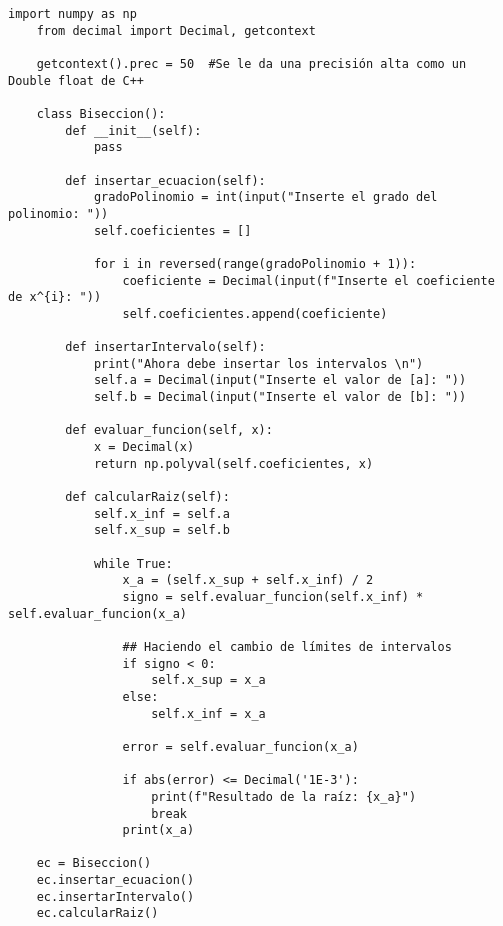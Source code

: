 \begin{lstlisting}[style=jupyter]
    import numpy as np
    from decimal import Decimal, getcontext
    
    getcontext().prec = 50  #Se le da una precisión alta como un Double float de C++
    
    class Biseccion():
        def __init__(self):
            pass
    
        def insertar_ecuacion(self):
            gradoPolinomio = int(input("Inserte el grado del polinomio: "))
            self.coeficientes = []
    
            for i in reversed(range(gradoPolinomio + 1)):
                coeficiente = Decimal(input(f"Inserte el coeficiente de x^{i}: "))
                self.coeficientes.append(coeficiente)
        
        def insertarIntervalo(self):
            print("Ahora debe insertar los intervalos \n")
            self.a = Decimal(input("Inserte el valor de [a]: "))
            self.b = Decimal(input("Inserte el valor de [b]: "))
    
        def evaluar_funcion(self, x):
            x = Decimal(x)
            return np.polyval(self.coeficientes, x)
        
        def calcularRaiz(self):
            self.x_inf = self.a
            self.x_sup = self.b
    
            while True:
                x_a = (self.x_sup + self.x_inf) / 2
                signo = self.evaluar_funcion(self.x_inf) * self.evaluar_funcion(x_a)
    
                ## Haciendo el cambio de límites de intervalos
                if signo < 0:
                    self.x_sup = x_a
                else:
                    self.x_inf = x_a
    
                error = self.evaluar_funcion(x_a)
    
                if abs(error) <= Decimal('1E-3'):
                    print(f"Resultado de la raíz: {x_a}")
                    break
                print(x_a)
    
    ec = Biseccion()
    ec.insertar_ecuacion()
    ec.insertarIntervalo()
    ec.calcularRaiz()
\end{lstlisting}

